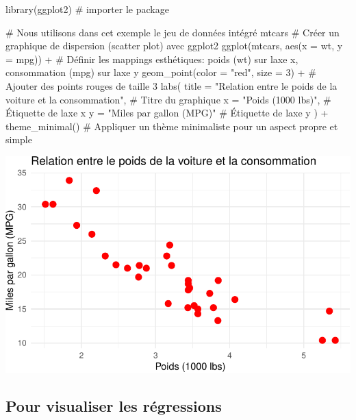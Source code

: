 \documentclass[
  letterpaper,
  DIV=11,
  numbers=noendperiod]{scrreprt}
\newenvironment{Shaded}{\begin{snugshade}}{\end{snugshade}}
\newcommand{\AttributeTok}[1]{\textcolor[rgb]{0.40,0.45,0.13}{#1}}
\newcommand{\CommentTok}[1]{\textcolor[rgb]{0.37,0.37,0.37}{#1}}
\newcommand{\DecValTok}[1]{\textcolor[rgb]{0.68,0.00,0.00}{#1}}
\newcommand{\FunctionTok}[1]{\textcolor[rgb]{0.28,0.35,0.67}{#1}}
\newcommand{\NormalTok}[1]{\textcolor[rgb]{0.00,0.23,0.31}{#1}}
\newcommand{\SpecialCharTok}[1]{\textcolor[rgb]{0.37,0.37,0.37}{#1}}
\newcommand{\StringTok}[1]{\textcolor[rgb]{0.13,0.47,0.30}{#1}}
\begin{document}
\begin{Shaded}
\begin{Highlighting}[]
\FunctionTok{library}\NormalTok{(ggplot2) }\CommentTok{\# importer le package}

\CommentTok{\# Nous utilisons dans cet exemple le jeu de données intégré mtcars}
\CommentTok{\# Créer un graphique de dispersion (scatter plot) avec ggplot2}
\FunctionTok{ggplot}\NormalTok{(mtcars, }\FunctionTok{aes}\NormalTok{(}\AttributeTok{x =}\NormalTok{ wt, }\AttributeTok{y =}\NormalTok{ mpg)) }\SpecialCharTok{+}  \CommentTok{\# Définir les mappings esthétiques: poids (wt) sur l\textquotesingle{}axe x, consommation (mpg) sur l\textquotesingle{}axe y}
  \FunctionTok{geom\_point}\NormalTok{(}\AttributeTok{color =} \StringTok{"red"}\NormalTok{, }\AttributeTok{size =} \DecValTok{3}\NormalTok{) }\SpecialCharTok{+}  \CommentTok{\# Ajouter des points rouges de taille 3}
  \FunctionTok{labs}\NormalTok{(}
    \AttributeTok{title =} \StringTok{"Relation entre le poids de la voiture et la consommation"}\NormalTok{,  }\CommentTok{\# Titre du graphique}
    \AttributeTok{x =} \StringTok{"Poids (1000 lbs)"}\NormalTok{,  }\CommentTok{\# Étiquette de l\textquotesingle{}axe x}
    \AttributeTok{y =} \StringTok{"Miles par gallon (MPG)"}  \CommentTok{\# Étiquette de l\textquotesingle{}axe y}
\NormalTok{  ) }\SpecialCharTok{+}
  \FunctionTok{theme\_minimal}\NormalTok{()  }\CommentTok{\# Appliquer un thème minimaliste pour un aspect propre et simple}
\end{Highlighting}
\end{Shaded}

\includegraphics{chapitre_6_files/figure-pdf/unnamed-chunk-2-1.pdf}

\subsection{Pour visualiser les
régressions}\label{pour-visualiser-les-ruxe9gressions}
\end{document}

